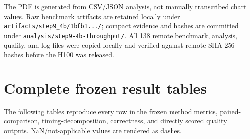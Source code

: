 \documentclass[10pt]{article}
\begin{document}
The PDF is generated from CSV/JSON analysis, not manually transcribed chart
values. Raw benchmark artifacts are retained locally under
\texttt{artifacts/step9\_4b/1bfb1.../}; compact evidence and hashes are
committed under \texttt{analysis/step9-4b-throughput/}. All 138 remote
benchmark, analysis, quality, and log files were copied locally and verified
against remote SHA-256 hashes before the H100 was released.

\appendix
\clearpage
\section{Complete frozen result tables}

The following tables reproduce every row in the frozen method metrics,
paired-comparison, timing-decomposition, correctness, and directly scored
quality outputs. NaN/not-applicable values are rendered as dashes.

\begin{landscape}
\scriptsize
\setlength{\tabcolsep}{3pt}

\end{landscape}
\end{document}
